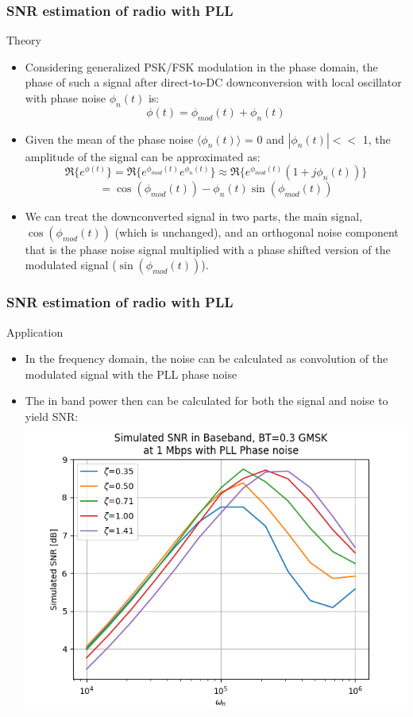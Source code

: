 \documentclass[t, screen, aspectratio=43]{beamer}
\begin{document}
\begin{frame}
	\frametitle{SNR estimation of radio with PLL}
	\begin{block}{Theory}
		\begin{itemize}
		\footnotesize
		\item Considering generalized PSK/FSK modulation in the phase domain, the phase of such a signal after direct-to-DC downconversion with local oscillator with phase noise $\phi_n(t)$ is:
		\begin{equation}
		\phi(t) = \phi_{mod}(t) + \phi_n(t)
		\end{equation}
		\item Given the mean of the phase noise $\langle\phi_n(t)\rangle$ = 0 and $|\phi_n(t)| <<$ 1, the amplitude of the signal can be approximated as:
		\begin{equation}
		\Re\{e^{\phi(t)}\} = \Re\{e^{\phi_{mod}(t)}e^{\phi_n(t)}\} \approx \Re\{e^{\phi_{mod}(t)}(1+j\phi_n(t))\}
		\end{equation}
		\begin{equation}
		= \cos(\phi_{mod}(t)) - \phi_n(t)\sin(\phi_{mod}(t))
		\end{equation}
		\item We can treat the downconverted signal in two parts, the main signal, $\cos(\phi_{mod}(t))$ (which is unchanged), and an orthogonal noise component that is the phase noise signal multiplied with a phase shifted version of the modulated signal ($\sin(\phi_{mod}(t))$). 
		\end{itemize}    
	\end{block}
\end{frame}


\begin{frame}
	\frametitle{SNR estimation of radio with PLL}
	\begin{block}{Application}
		\begin{itemize}
		\footnotesize
		\item In the frequency domain, the noise can be calculated as convolution of the modulated signal with the PLL phase noise
		\item The in band power then can be calculated for both the signal and noise to yield SNR:
		\center\includegraphics[width=0.6\linewidth]{snr.png}
		\end{itemize}    
	\end{block}
\end{frame}
\end{document}
